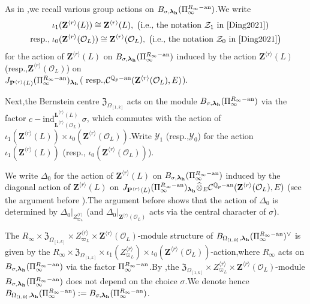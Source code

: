 \documentclass[SecEq,CM,GP]{degruyter-crelle} %
\theoremstyle{plain}
\newcommand{\ana}{{\rm an}}
\newcommand{\lrr}{{\langle r\rangle}}
\newcommand{\omepik}{\Omega_{[1,k]}}
\newcommand{\BQ}{{\mathbb{Q}}}
\newcommand{\bL}{{\mathbf{L}}}
\newcommand{\bP}{{\mathbf{P}}}
\newcommand{\bZ}{{\mathbf{Z}}}
\newcommand{\bh}{{\mathbf{h}}}
\newcommand{\cC}{\mathcal C}
\newcommand{\cO}{\mathcal O}
\newcommand{\cZ}{\mathcal Z}
\newcommand{\cY}{\mathcal Y}
\newcommand{\FZ}{{\mathfrak{Z}}}
\begin{document}
As in \cite[Sections 3.1.2]{Ding2021},\;we recall various group actions on $B_{\sigma,{\bm\lambda}_\bh}(\Pi_\infty^{R_\infty-\ana})$.\;We write
\begin{equation}
\begin{aligned}
	&\;\iota_1(\bZ^{\lrr}(L))\cong \bZ^{\lrr}(L),\;\big(\text{i.e., the notation $\cZ_1$ in \cite[(3.4)]{Ding2021}})\\
	\text{resp.,}&\;\iota_0(\bZ^{\lrr}(\cO_L))\cong \bZ^{\lrr}(\cO_L),\;\big(\text{i.e., the notation $\cZ_0$ in \cite[(3.4)]{Ding2021}}\big)
\end{aligned}
\end{equation}
for  the action of  $\bZ^{\lrr}(L)$ on $B_{\sigma,{\bm\lambda}_\bh}(\Pi_\infty^{R_\infty-\ana})$ induced by the action $\bZ^{\lrr}(L)$ (resp.,\;$\bZ^{\lrr}(\cO_L)$) on \\ $J_{\bP^{\lrr}(L)}(\Pi_\infty^{R_\infty-\ana})_{{\bm\lambda}_\bh}$( resp.,\;$\cC^{\BQ_p-\ana}(\bZ^{\lrr}(\cO_L),E)$).\;

Next,\;the Bernstein centre $\FZ_{\omepik}$  acts on the module $B_{\sigma,{\bm\lambda}_\bh}(\Pi_\infty^{R_\infty-\ana})$ via the factor $c-\mathrm{ind}_{\bL^{\lrr}(\cO_L)}^{\bL^{\lrr}(L)}\sigma$, which commutes with the action of $\iota_1(\bZ^{\lrr}(L))\times \iota_0(\bZ^{\lrr}(\cO_L))$.\;Write $\cY_1$ (resp.,\;$\cY_0$) for the action $\iota_1(\bZ^{\lrr}(L))$ (resp., $\iota_0(\bZ^{\lrr}(\cO_L))$).\;

We write $\Delta_0$ for the action of  $\bZ^{\lrr}(L)$ on $B_{\sigma,{\bm\lambda}_\bh}(\Pi_\infty^{R_\infty-\ana})$ induced by the diagonal action of $\bZ^{\lrr}(L)$ on $J_{\bP^{\lrr}(L)}(\Pi_\infty^{R_\infty-\ana})_{{\bm\lambda}_\bh}\widehat{\otimes}_E\cC^{\BQ_p-\ana}(\bZ^{\lrr}(\cO_L),E)$ (see the argument before \cite[(3.4)]{Ding2021}).\;The argument before \cite[Lemma 3.1.2]{Ding2021} shows that the action of $\Delta_0$ is determined by $\Delta_0|_{Z^{\lrr}_{\varpi_L}}$ (and $\Delta_0|_{\bZ^{\lrr}(\cO_L)}$ acts via the central character of $\sigma$).

The $R_{\infty}\times\FZ_{\omepik}\times Z^{\lrr}_{\varpi_L}\times \bZ^{\lrr}(\cO_L)$-module structure of $B_{\omepik,{\bm\lambda}_\bh}(\Pi_\infty^{R_\infty-\ana})^\vee$ is given by the $R_{\infty}\times\FZ_{\omepik}\times\iota_1(Z^{\lrr}_{\varpi_L})\times \iota_0(\bZ^{\lrr}(\cO_L))$-action,\;where $R_{\infty}$ acts on $B_{\sigma,{\bm\lambda}_\bh}(\Pi_\infty^{R_\infty-\ana})$ via the factor $\Pi_\infty^{R_\infty-\ana}$.\;By \cite[Lemma 3.17]{Ding2021},\;the $\FZ_{\omepik}\times Z^{\lrr}_{\varpi_L}\times \bZ^{\lrr}(\cO_L)$-module $B_{\sigma,{\bm\lambda}_\bh}(\Pi_\infty^{R_\infty-\ana})$ does not depend on the choice $\sigma$.\;We denote hence $B_{\omepik,{\bm\lambda}_\bh}(\Pi_\infty^{R_\infty-\ana}):=B_{\sigma,{\bm\lambda}_\bh}(\Pi_\infty^{R_\infty-\ana})$.\;
\end{document}
